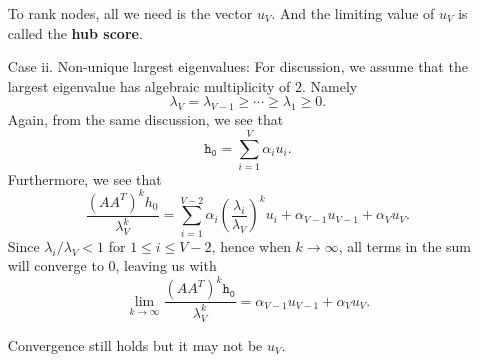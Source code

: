 \begin{enumerate}
		\begin{remark}
			To rank nodes, all we need is the vector \(u_{V}\). And the limiting value of \(u_{V}\) is called the \textbf{hub score}.
		\end{remark}
	\item[Case ii.] Non-unique largest eigenvalues: For discussion, we assume that the largest eigenvalue has algebraic multiplicity of \(2\). Namely
		\[
			\lambda_V = \lambda_{V-1} \geq \cdots \geq \lambda_{1}\geq 0.
		\]
		Again, from the same discussion, we see that
		\[
			\mathtt{h_{0}} = \sum\limits_{i=1}^{V} \alpha_{i}u_{i}.
		\]
		Furthermore, we see that
		\[
			\frac{\left(A A^{T}\right)^k h_0}{\lambda_{V}^k} = \sum\limits_{i=1}^{V - 2} \alpha_{i}\left(\frac{\lambda_{i}}{\lambda_{V}}\right)^k u_{i} + \alpha_{V-1}u_{V-1}+\alpha_{V} u_{V}.
		\]
		Since \(\lambda_{i}/\lambda_{V}< 1\) for \(1\leq i\leq V-2\), hence when \(k\to \infty \), all terms in the sum will converge to \(0\), leaving us with
		\[
			\lim_{k \to \infty} \frac{(A A^{T})^{k}\mathtt{h_0}}{\lambda_V^k} = \alpha_{V-1}u_{V-1} + \alpha_V u_V.
		\]
		\begin{remark}
			Convergence still holds but it may not be \(u_{V}\).
		\end{remark}
\end{enumerate}



